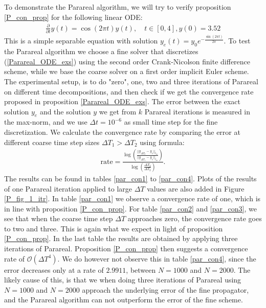 \\
\\
To demonstrate the Parareal algorithm, we will try to verify proposition \ref{P_con_prop} for the following linear ODE:
\begin{align}
\frac{\partial}{\partial t} y(t) =\cos(2\pi t)y(t), \quad t\in[0,4],y(0)=3.52 \label{Parareal_ODE_exs}
\end{align}
This is a simple separable equation with solution $y_e(t)=y_0e^{-\frac{\sin(2\pi t)}{2\pi}}$. To test the Parareal algorithm we choose a fine solver that discretizes (\ref{Parareal_ODE_exs}) using the second order Crank-Nicolson finite difference scheme\cite{crank1947practical}, while we base the coarse solver on a first order implicit Euler scheme. The experimental setup, is to do "zero", one, two and three iterations of Parareal on different time decompositions, and then check if we get the convergence rate proposed in proposition \ref{Parareal_ODE_exs}. The error between the exact solution $y_e$ and the solution $y$ we get from $k$ Parareal iterations is measured in the max-norm, and we use $\Delta t=10^{-6}$ as small time step for the fine discretization. We calculate the convergence rate by comparing the error at different coarse time step sizes $\Delta T_1>\Delta T_2$ using formula:
\begin{align}
\textrm{rate}=\frac{\log(\frac{||y_{\Delta T_2} -y_e||_{l_{\infty}}}{||y_{\Delta T_1}-y_e||_{l_{\infty}}})}{\log(\frac{\Delta T_2}{ \Delta T_2})}. \label{RateDef}
\end{align} 
The results can be found in tables \ref{par_con1} to \ref{par_con4}. Plots of the results of one Parareal iteration applied to large $\Delta T$ values are also added in Figure \ref{P_fig_1_itr}. In table \ref{par_con1} we observe a convergence rate of one, which is in line with proposition \ref{P_con_prop}. For table \ref{par_con2} and \ref{par_con3}, we see that when the coarse time step $\Delta T$ approaches zero, the convergence rate goes to two and three. This is again what we expect in light of proposition \ref{P_con_prop}. In the last table the results are obtained by applying three iterations of Parareal. Proposition \ref{P_con_prop} then suggests a convergence rate of $\mathcal{O}(\Delta T^4)$. We do however not observe this in table \ref{par_con4}, since the error decreases only at a rate of $2.9911$, between $N=1000$ and $N=2000$. The likely cause of this, is that we when doing three iterations of Parareal using $N=1000$ and $N=2000$ approach the underlying error of the fine propagator, and the Parareal algorithm can not outperform the error of the fine scheme.
